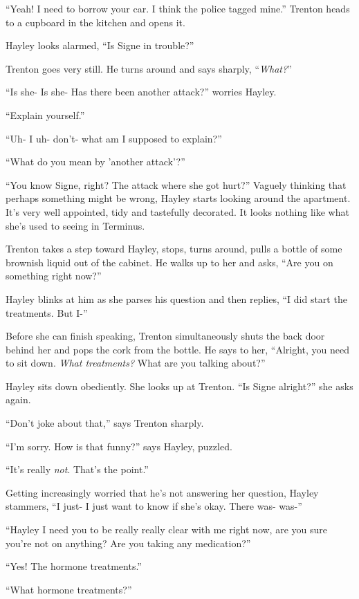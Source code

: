 ``Yeah!  I need to borrow your car.  I think the police tagged mine.''  Trenton heads to a cupboard in the kitchen and opens it.

Hayley looks alarmed, ``Is Signe in trouble?''

Trenton goes very still.  He turns around and says sharply, ``\textit{What?}''

``Is she- Is she- Has there been another attack?'' worries Hayley.

``Explain yourself.''

``Uh- I uh- don't- what am I supposed to explain?''

``What do you mean by 'another attack'?''

``You know Signe, right?  The attack where she got hurt?'' Vaguely thinking that perhaps something might be wrong, Hayley starts looking around the apartment.  It's very well appointed, tidy and tastefully decorated.  It looks nothing like what she's used to seeing in Terminus.



Trenton takes a step toward Hayley, stops, turns around, pulls a bottle of some brownish liquid out of the cabinet.  He walks up to her and asks, ``Are you on something right now?'' 

Hayley blinks at him as she parses his question and then replies, ``I did start the treatments. But I-''

Before she can finish speaking, Trenton simultaneously shuts the back door behind her and pops the cork from the bottle. He says to her, ``Alright, you need to sit down.  \textit{What treatments?}  What are you talking about?''

Hayley sits down obediently.  She looks up at Trenton.  ``Is Signe alright?'' she asks again.

``Don't joke about that,'' says Trenton sharply.

``I'm sorry.  How is that funny?'' says Hayley, puzzled.

``It's really \textit{not}.  That's the point.''

Getting increasingly worried that he's not answering her question, Hayley stammers, ``I just- I just want to know if she's okay.  There was- was-''

``Hayley I need you to be really really clear with me right now, are you sure you're not on anything?  Are you taking any medication?''

``Yes!  The hormone treatments.''

``What hormone treatments?''

